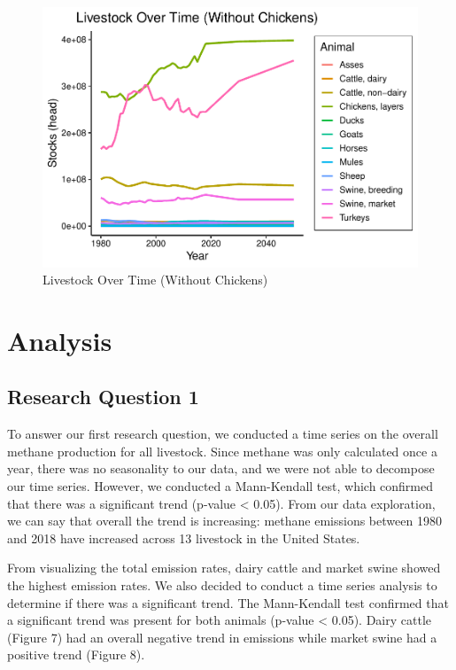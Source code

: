 \documentclass[
  12pt,
]{article}
\begin{document}
\begin{figure}
\centering
\includegraphics{SultzerSwitFinalProject_files/figure-latex/no.chix-1.pdf}
\caption{Livestock Over Time (Without Chickens)}
\end{figure}

\newpage

\hypertarget{analysis}{%
\section{Analysis}\label{analysis}}

\hypertarget{research-question-1}{%
\subsection{Research Question 1}\label{research-question-1}}

To answer our first research question, we conducted a time series on the
overall methane production for all livestock. Since methane was only
calculated once a year, there was no seasonality to our data, and we
were not able to decompose our time series. However, we conducted a
Mann-Kendall test, which confirmed that there was a significant trend
(p-value \textless{} 0.05). From our data exploration, we can say that
overall the trend is increasing: methane emissions between 1980 and 2018
have increased across 13 livestock in the United States.

From visualizing the total emission rates, dairy cattle and market swine
showed the highest emission rates. We also decided to conduct a time
series analysis to determine if there was a significant trend. The
Mann-Kendall test confirmed that a significant trend was present for
both animals (p-value \textless{} 0.05). Dairy cattle (Figure 7) had an
overall negative trend in emissions while market swine had a positive
trend (Figure 8).
\end{document}
